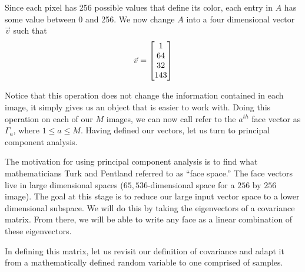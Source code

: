 \documentclass[12pt]{report}
\begin{document}

            Since each pixel has 256 possible values that define its color, each entry in $A$ has some value between 0 and 256. We now change $A$ into a four dimensional vector $\vec{v}$ such that
                    \[
                        \vec{v} = \begin{bmatrix}
                            1 \\
                            64 \\
                            32 \\
                            143
                        \end{bmatrix}
                    \]

            Notice that this operation does not change the information contained in each image, it simply gives us an object that is easier to work with. Doing this operation on each of our $M$ images, we can now call refer to the $a^{th}$ face vector as $\Gamma_a$, where $1 \leq a \leq M$. Having defined our vectors, let us turn to principal component analysis.

            The motivation for using principal component analysis is to find what mathematicians Turk and Pentland referred to as ``face space.'' The face vectors live in large dimensional spaces ($65,536$-dimensional space for a $256$ by $256$ image). The goal at this stage is to reduce our large input vector space to a lower dimensional subspace. We will do this by taking the eigenvectors of a covariance matrix. From there, we will be able to write any face as a linear combination of these eigenvectors.

            In defining this matrix, let us revisit our definition of covariance and adapt it from a mathematically defined random variable to one comprised of samples.

\end{document}
